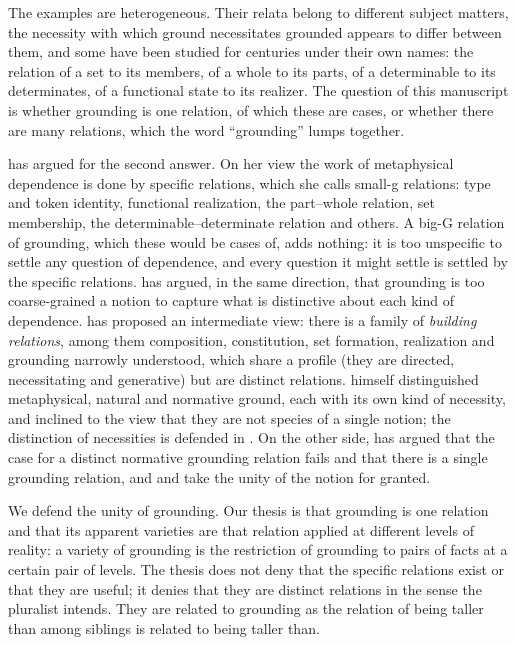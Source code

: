 \documentclass{situationist-preprint}
\begin{document}
The examples are heterogeneous. Their relata belong to different subject matters, the necessity with which ground necessitates grounded appears to differ between them, and some have been studied for centuries under their own names: the relation of a set to its members, of a whole to its parts, of a determinable to its determinates, of a functional state to its realizer. The question of this manuscript is whether grounding is one relation, of which these are cases, or whether there are many relations, which the word \enquote{grounding} lumps together.

\citet{Wilson2014} has argued for the second answer. On her view the work of metaphysical dependence is done by specific relations, which she calls small-g relations: type and token identity, functional realization, the part--whole relation, set membership, the determinable--determinate relation and others. A big-G relation of grounding, which these would be cases of, adds nothing: it is too unspecific to settle any question of dependence, and every question it might settle is settled by the specific relations. \citet{Koslicki2015} has argued, in the same direction, that grounding is too coarse-grained a notion to capture what is distinctive about each kind of dependence. \citet{Bennett2017} has proposed an intermediate view: there is a family of \emph{building relations}, among them composition, constitution, set formation, realization and grounding narrowly understood, which share a profile (they are directed, necessitating and generative) but are distinct relations. \citet{Fine2012} himself distinguished metaphysical, natural and normative ground, each with its own kind of necessity, and inclined to the view that they are not species of a single notion; the distinction of necessities is defended in \citet{Fine2002}. On the other side, \citet{Berker2018} has argued that the case for a distinct normative grounding relation fails and that there is a single grounding relation, and \citet{Rosen2010} and \citet{Audi2012} take the unity of the notion for granted.

We defend the unity of grounding. Our thesis is that grounding is one relation and that its apparent varieties are that relation applied at different levels of reality: a variety of grounding is the restriction of grounding to pairs of facts at a certain pair of levels. The thesis does not deny that the specific relations exist or that they are useful; it denies that they are distinct relations in the sense the pluralist intends. They are related to grounding as the relation of being taller than among siblings is related to being taller than.
\end{document}
